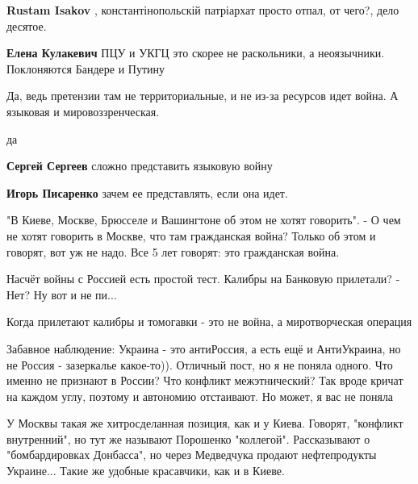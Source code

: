 \begin{itemize}
\begin{itemize}
\textbf{Rustam Isakov} , константінопольскій патріархат просто отпал, от чего?, дело десятое.

\textbf{Елена Кулакевич} ПЦУ и УКГЦ это скорее не раскольники, а неоязычники. Поклоняются Бандере и Путину
\end{itemize} %


Да, ведь претензии там не территориальные, и не из-за ресурсов идет война. А
языковая и мировоззренческая.

\begin{itemize} %
да

\textbf{Сергей Сергеев} сложно представить языковую войну

\textbf{Игорь Писаренко} зачем ее представлять, если она идет.


"В Киеве, Москве, Брюсселе и Вашингтоне об этом не хотят говорить". - О чем не
хотят говорить в Москве, что там гражданская война? Только об этом и говорят,
вот уж не надо. Все 5 лет говорят: это гражданская война.

\end{itemize} %

Насчёт войны с Россией есть простой тест. Калибры на Банковую прилетали? - Нет? Ну вот и не пи...

\begin{itemize} %
Когда прилетают калибры и томогавки - это не война, а миротворческая операция
\end{itemize} %


Забавное наблюдение: Украина - это антиРоссия, а есть ещё и АнтиУкраина, но не
Россия - зазеркалье какое-то)). Отличный пост, но я не поняла одного. Что
именно не признают в России? Что конфликт межэтнический? Так вроде кричат на
каждом углу, поэтому и автономию отстаивают. Но может, я вас не поняла

\begin{itemize} %

У Москвы такая же хитросделанная позиция, как и у Киева. Говорят, "конфликт
внутренний", но тут же называют Порошенко "коллегой". Рассказывают о
"бомбардировках Донбасса", но через Медведчука продают нефтепродукты Украине...
Такие же удобные красавчики, как и в Киеве.



\end{itemize}
\end{itemize}
